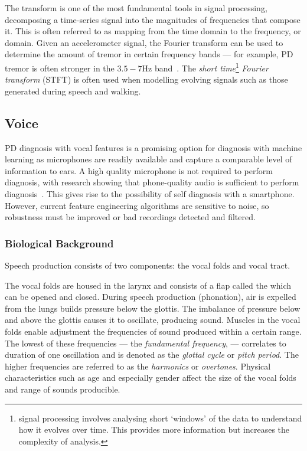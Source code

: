 \documentclass[12pt, twoside]{book}
\renewcommand\emph[1]{\textit{\color{USred}{#1}}}
\begin{document}
The \emph{Fourier} transform is one of the most fundamental tools in signal processing, decomposing a time-series signal into the magnitudes of frequencies that compose it. This is often referred to as mapping from the time domain to the frequency, or \emph{spectral} domain. Given an accelerometer signal, the Fourier transform can be used to determine the amount of tremor in certain frequency bands --- for example, PD tremor is often stronger in the $3.5-7$Hz band~\cite{duval2004detection}. The \textit{short time}\footnote{\emph{Short time} signal processing involves analysing short `windows' of the data to understand how it evolves over time. This provides more information but increases the complexity of analysis.} \textit{Fourier transform} (STFT) is often used when modelling evolving signals such as those generated during speech and walking. 




\subsection{Voice}
PD diagnosis with vocal features is a promising option for diagnosis with machine learning as microphones are readily available and capture a comparable level of information to ears. A high quality microphone is not required to perform diagnosis, with research showing that phone-quality audio is sufficient to perform diagnosis~\cite{splittledysphonia2009}. This gives rise to the possibility of self diagnosis with a smartphone. However, current feature engineering algorithms are sensitive to noise, so robustness must be improved or bad recordings detected and filtered.


\subsubsection{Biological Background}
\label{speechbio}
Speech production consists of two components: the vocal folds and vocal tract. 

The vocal folds are housed in the larynx and consists of a flap called the \emph{glottis} which can be opened and closed. During speech production (phonation), air is expelled from the lungs builds pressure below the glottis. The imbalance of pressure below and above the glottis causes it to oscillate, producing sound. Muscles in the vocal folds enable adjustment the frequencies of sound produced within a certain range. The lowest of these frequencies --- the \textit{fundamental frequency}, \emph{$f_0$} --- correlates to duration of one oscillation and is denoted as the \textit{glottal cycle} or \textit{pitch period}. The higher frequencies are referred to as the \textit{harmonics} or \textit{overtones}. Physical characteristics such as age and especially gender affect the size of the vocal folds and range of sounds producible. 
\end{document}
